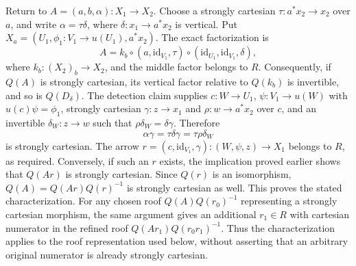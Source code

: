 \medskip\noindent
Return to $A = (a,b,\alpha) : X_1 \to X_2$.
Choose a strongly cartesian $\tau : a^*x_2 \to x_2$ over $a$, and
write $\alpha = \tau\delta$, where $\delta : x_1 \to a^*x_2$ is vertical.
Put $X_a = (U_1,\phi_1 : V_1 \to u(U_1),a^*x_2)$.
The exact factorization is
$$
A = k_b \circ (a,\text{id}_{V_1},\tau)
\circ (\text{id}_{U_1},\text{id}_{V_1},\delta),
$$
where $k_b : (X_2)_b \to X_2$, and the middle factor belongs to $R$.
Consequently, if $Q(A)$ is strongly cartesian, its vertical factor
relative to $Q(k_b)$ is invertible, and so is $Q(D_\delta)$.
The detection claim supplies $c : W \to U_1$, $\psi : V_1 \to u(W)$
with $u(c)\psi = \phi_1$, strongly cartesian
$\gamma : z \to x_1$ and $\rho : w \to a^*x_2$ over $c$, and an
invertible $\delta_W : z \to w$ such that
$\rho\delta_W = \delta\gamma$.
Therefore
$$
\alpha\gamma = \tau\delta\gamma = \tau\rho\delta_W
$$
is strongly cartesian. The arrow
$r = (c,\text{id}_{V_1},\gamma) : (W,\psi,z) \to X_1$
belongs to $R$, as required.
Conversely, if such an $r$ exists, the implication proved earlier
shows that $Q(Ar)$ is strongly cartesian. Since $Q(r)$ is an
isomorphism, $Q(A) = Q(Ar)Q(r)^{-1}$ is strongly cartesian as well.
This proves the stated characterization.
For any chosen roof $Q(A)Q(r_0)^{-1}$ representing a strongly
cartesian morphism, the same argument gives an additional $r_1 \in R$
with cartesian numerator in the refined roof
$Q(Ar_1)Q(r_0r_1)^{-1}$. Thus the characterization applies to the
roof representation used below, without asserting that an arbitrary
original numerator is already strongly cartesian.
